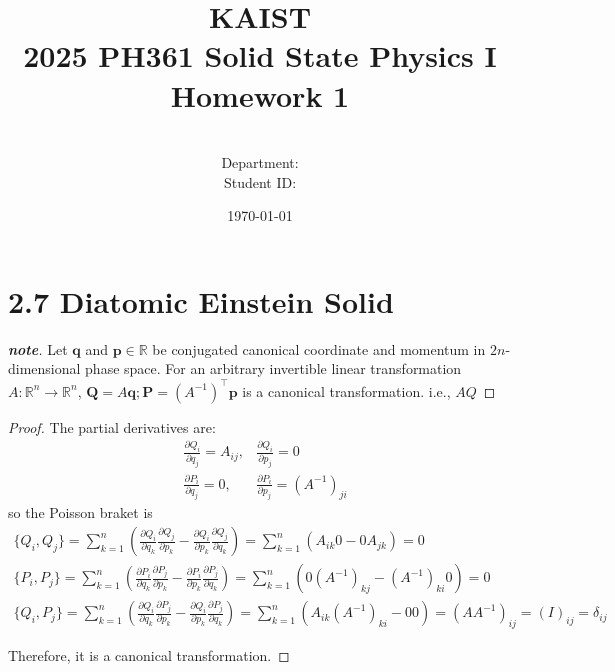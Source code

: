 \documentclass[a4paper,11pt]{article}
\title{KAIST\\2025 PH361 Solid State Physics I\\
Homework 1\bigskip}
\author{\textbf{\Large \name} \\
Department: \department\\
Student ID: \studentid}
\date{\today}
\newenvironment{note}
  {\renewcommand\qedsymbol{$\blacksquare$}\begin{proof}[\textnormal{\textbf{note}}]}
  {\end{proof}}
\begin{document}
\thispagestyle{empty}
\maketitle
\tableofcontents
{}

\newcommand{\der}[2][]{\frac{d #1}{d #2}}
\newcommand{\pder}[2][]{\frac{\partial #1}{\partial #2}}
\newcommand{\grad}{\operatorname{grad}}
\newcommand{\diver}{\operatorname{div}}
\newcommand{\curl}{\operatorname{curl}}
\newcommand{\boltz}{k_{\mathrm{B}}}
\newcommand{\tr}{\operatorname{tr}}
\newcommand{\Li}{\operatorname{Li}}

\section{2.7 Diatomic Einstein Solid}

\begin{note}

Let $\mathbf q$ and $\mathbf p \in \mathbb R$ be conjugated canonical coordinate and momentum in $2n$-dimensional phase space. For an arbitrary invertible linear transformation $A:\mathbb R^n \rightarrow \mathbb R^n$, $\mathbf Q = A\mathbf q; \mathbf P = (A^{-1})^\top\mathbf p$ is a canonical transformation. i.e., $AQ$
    
\end{note}

\begin{proof}
    The partial derivatives are:
    \begin{align}
        &\frac{\partial Q_i}{\partial q_j} = A_{ij},
        &\frac{\partial Q_i}{\partial p_j} = 0 \\
        &\frac{\partial P_i}{\partial q_j} = 0,
        &\frac{\partial P_i}{\partial p_j} = (A^{-1})_{ji}
    \end{align}
    so the Poisson braket is
    \begin{gather}
        \{Q_i, Q_j\} = \sum_{k=1}^n\left(\frac{\partial Q_i}{\partial q_k}\frac{\partial Q_j}{\partial p_k}-\frac{\partial Q_i}{\partial p_k}\frac{\partial Q_j}{\partial q_k}\right) = \sum_{k=1}^n\left(A_{ik}0-0A_{jk}\right) = 0\\
        \{P_i, P_j\} = \sum_{k=1}^n\left(\frac{\partial P_i}{\partial q_k}\frac{\partial P_j}{\partial p_k}-\frac{\partial P_i}{\partial p_k}\frac{\partial P_j}{\partial q_k}\right) = \sum_{k=1}^n\left(0(A^{-1})_{kj}-(A^{-1})_{ki}0\right) = 0\\
        \{Q_i, P_j\} = \sum_{k=1}^n\left(\frac{\partial Q_i}{\partial q_k}\frac{\partial P_j}{\partial p_k}-\frac{\partial Q_i}{\partial p_k}\frac{\partial P_j}{\partial q_k}\right)
        = \sum_{k=1}^n\left(A_{ik}(A^{-1})_{ki}-00\right) = (AA^{-1})_{ij}=  (I)_{ij}=\delta_{ij}
    \end{gather}

    Therefore, it is a canonical transformation.
\end{proof}
\end{document}
